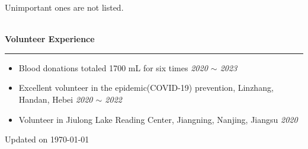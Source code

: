 \documentclass[12pt]{article}
\newcommand{\sect}[1]{
    ~\\ \noindent \textbf{#1} \medskip \hrule \medskip
}
\begin{document}
\hfill {\tiny Unimportant ones are not listed.}


\sect{Volunteer Experience}

\begin{itemize}[noitemsep,nolistsep]
    \item Blood donations totaled 1700 mL for six times \hfill \textit{2020 $\sim$ 2023}
    \item Excellent volunteer in the epidemic(COVID-19) prevention, Linzhang, Handan, Hebei \hfill \textit{2020 $\sim$ 2022}
    \item Volunteer in Jiulong Lake Reading Center, Jiangning, Nanjing, Jiangsu \hfill \textit{2020}
\end{itemize}

\hfill {\tiny Updated on \today}
\end{document}
